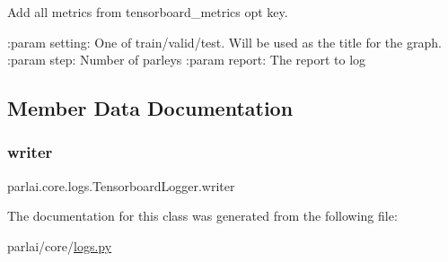 \begin{DoxyVerb}Add all metrics from tensorboard_metrics opt key.

:param setting:
    One of train/valid/test. Will be used as the title for the graph.
:param step:
    Number of parleys
:param report:
    The report to log
\end{DoxyVerb}
 

\subsection{Member Data Documentation}
\mbox{\label{classparlai_1_1core_1_1logs_1_1TensorboardLogger_afc71d93e950d01b95fc824d347907a58}} 
\subsubsection{\texorpdfstring{writer}{writer}}
{\footnotesize\ttfamily parlai.\+core.\+logs.\+Tensorboard\+Logger.\+writer}



The documentation for this class was generated from the following file\+:\begin{DoxyCompactItemize}
\item 
parlai/core/\hyperlink{logs_8py}{logs.\+py}\end{DoxyCompactItemize}
